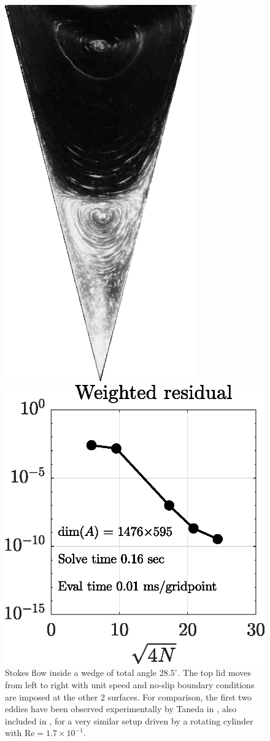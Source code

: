 \begin{figure}[H]
	\begin{minipage}{0.45\linewidth}
		\centering
		\includegraphics[width=0.6\linewidth]{Figures/wedge_exp}
	\end{minipage}

	\includegraphics[width=0.5\linewidth]{Figures/wedge_conv}
	\caption{Stokes flow inside a wedge of total angle $28.5^\circ$. The top lid moves from left to right with unit speed and no-slip boundary conditions are imposed at the other 2 surfaces. For comparison, the first two eddies have been observed experimentally by Taneda in \cite[Fig.~19]{taneda79}, also included in \cite[Fig.~10]{vandyke82}, for a very similar setup driven by a rotating cylinder with $\text{Re}=1.7\times10^{-1}$.}
	\label{fig:wedge}
\end{figure} 

